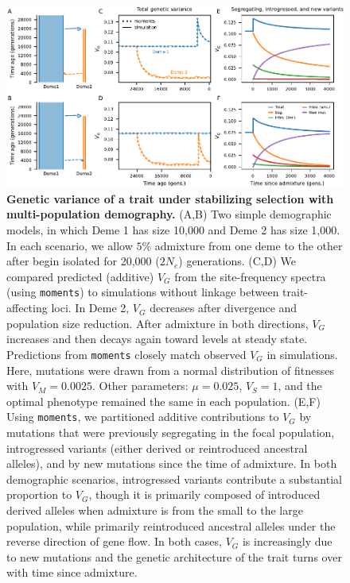 \documentclass{article}
\newcommand{\moments}{\texttt{moments}\xspace}
\begin{document}
\begin{figure}[tb!]
    \centering
    \includegraphics{../figures/reciprocal_admixture.pdf}
    \caption{
        \textbf{Genetic variance of a trait under stabilizing selection with
        multi-population demography.}
        (A,B) Two simple demographic models, in which Deme 1 has size 10,000
        and Deme 2 has size 1,000. In each scenario, we allow $5\%$ admixture
        from one deme to the other after begin isolated for 20,000 ($2N_e$)
        generations.
        (C,D) We compared predicted (additive) $V_G$ from the site-frequency
        spectra (using \moments) to simulations
        without linkage between trait-affecting loci. In Deme 2, $V_G$ decreases
        after divergence and population size reduction. After admixture in both
        directions, $V_G$ increases and then decays again toward levels at steady
        state. Predictions from \moments closely match observed $V_G$ in
        simulations.
        Here, mutations were drawn from a normal distribution of fitnesses
        with $V_M=0.0025$.
        Other parameters: $\mu=0.025$, $V_S=1$, and the optimal phenotype remained
        the same in each population.
        (E,F) Using \moments, we partitioned additive contributions to $V_G$ by
        mutations that were previously segregating in the focal population,
        introgressed variants (either derived or reintroduced ancestral alleles),
        and by new mutations since the time of admixture. In both demographic
        scenarios, introgressed variants contribute a substantial proportion to
        $V_G$, though it is primarily composed of introduced derived alleles when
        admixture is from the small to the large population, while primarily
        reintroduced ancestral alleles under the reverse direction of gene flow.
        In both cases, $V_G$ is increasingly due to new mutations and the genetic
        architecture of the trait turns over with time since admixture.
    }
    \label{fig:toy-admixture}
\end{figure}
\end{document}
